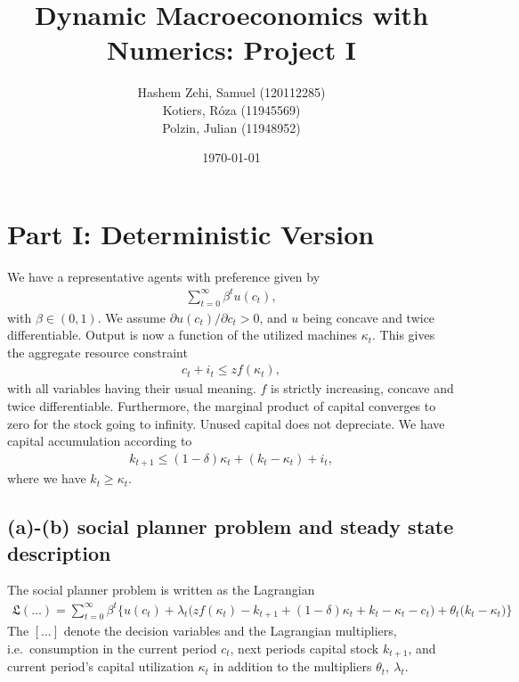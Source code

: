 \documentclass[a4paper]{article}
\title{Dynamic Macroeconomics with Numerics: Project I}
\author{Hashem Zehi, Samuel (120112285)\\Kotiers, Róza (11945569)\\Polzin, Julian (11948952)}
\date{\today}
\theoremstyle{definition}
\begin{document}
\maketitle
\newpage
\section{Part I: Deterministic Version}
We have a representative agents with preference given by
	\begin{align*}
	\sum\limits_{t=0}^{\infty} \beta^t u(c_t),
	\end{align*}
with $\beta \in (0,1)$. We assume $\partial u(c_t)/\partial c_t > 0$, and $u$ being concave and twice differentiable. Output is now a function of the utilized machines $\kappa_t$. This gives the aggregate resource constraint
	\begin{align*}
	c_t + i_t \leq z f(\kappa_t),
	\end{align*}	
with all variables having their usual meaning. $f$ is strictly increasing, concave and twice differentiable. Furthermore, the marginal product of capital converges to zero for the stock going to infinity. Unused capital does not depreciate. We have capital accumulation according to 
	\begin{align*}
	k_{t+1} \leq (1-\delta)\kappa_t + (k_t - \kappa_t)+i_t,
	\end{align*}	
where we have $k_t \geq \kappa_t$. 
\subsection{(a)-(b) social planner problem and steady state description}
The social planner problem is written as the Lagrangian
	\begin{align*}
	\mathfrak L(\dots) = \sum\limits_{t=0}^{\infty} \beta^t \Bigg\{ u(c_t) + \lambda_t \Big(z f(\kappa_t)- k_{t+1}+(1-\delta)\kappa_t+k_t - \kappa_t -c_t \Big)+ \theta_t \Big( k_t - \kappa_t \Big) \Bigg\}
	\end{align*}
The $[\dots]$ denote the decision variables and the Lagrangian multipliers, i.e.\ consumption in the current period $c_t$, next periods capital stock $k_{t+1}$, and current period's capital utilization $\kappa_t$ in addition to the multipliers $\theta_t,\ \lambda_t$. 
	
\end{document}
